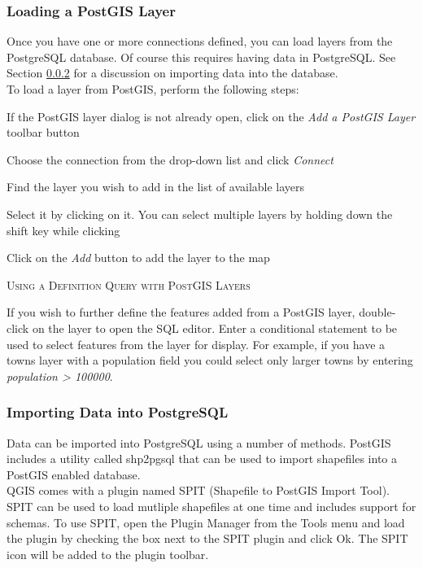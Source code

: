 \documentclass[10pt,english]{article}
\newcommand\qgistip[1]{\raggedright\small{#1}}
\begin{document}
\begin{onehalfspace}
\subsubsection{Loading a PostGIS Layer}
Once you have one or more connections defined, you can load layers from the PostgreSQL database. Of course this requires having data in PostgreSQL. See Section \ref{sec:loading_postgis_data} for a discussion on importing data into the database. \\

To load a layer from PostGIS, perform the following steps:
\begin{compactenum}
\item If the PostGIS layer dialog is not already open, click on the \textit{Add a PostGIS Layer} toolbar button
\item Choose the connection from the drop-down list and click \textsl{Connect}
\item Find the layer you wish to add in the list of available layers
\item Select it by clicking on it. You can select multiple layers by holding down the shift key while clicking
\item Click on the \textsl{Add} button to add the layer to the map
\end{compactenum}
\begin{Tip}\caption{\textsc{Using a Definition Query with PostGIS Layers}}
\qgistip{If you wish to further define the features added from a PostGIS layer, double-click on the layer to open the SQL editor. Enter a conditional statement to be used to select features from the layer for display. For example, if you have a towns layer with a population field you could select only larger towns by entering \textsl{population > 100000}. 
}
\end{Tip}
\subsubsection{Importing Data into PostgreSQL}\label{sec:loading_postgis_data} 
Data can be imported into PostgreSQL using a number of methods. PostGIS includes a utility called shp2pgsql that can be used to import shapefiles into a PostGIS enabled database. \\

QGIS comes with a plugin named SPIT (Shapefile to PostGIS Import Tool). SPIT can be used to load mutliple shapefiles at one time and includes support for schemas. To use SPIT, open the Plugin Manager from the Tools menu and load the plugin by checking the box next to the SPIT plugin and click Ok. The SPIT icon will be added to the plugin toolbar. \\


\end{onehalfspace}
\end{document}

